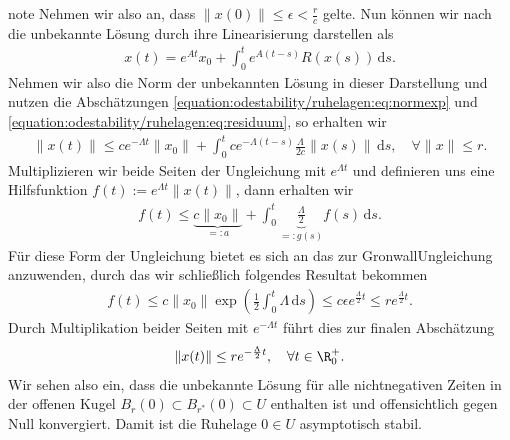 \documentclass[letterpaper,10pt,english]{jupyterBook}
\begin{document}
\begin{sphinxadmonition}{note}
\sphinxAtStartPar
Nehmen wir also an, dass \(\|x(0)\| \leq \epsilon <\frac{r}{c}\) gelte.
Nun können wir nach {\hyperref[\detokenize{odestability/ruhelagen:lem:intexpglgn}]{}} die unbekannte Lösung durch ihre Linearisierung darstellen als
\begin{equation*}
\begin{split}x(t) = e^{At}x_0 + \int_0^t e^{A(t-s)} R(x(s))\, \mathrm{d}s.\end{split}
\end{equation*}
\sphinxAtStartPar
Nehmen wir also die Norm der unbekannten Lösung in dieser Darstellung und nutzen die Abschätzungen \eqref{equation:odestability/ruhelagen:eq:normexp} und \eqref{equation:odestability/ruhelagen:eq:residuum}, so erhalten wir
\begin{equation*}
\begin{split}\|x(t)\|\leq ce^{-\Lambda t}\|x_0\| + \int_0^tce^{-\Lambda (t-s)}\frac{\Lambda}{2c}\|x(s)\|\, \mathrm{d}s, \quad \forall \|x\| \leq r.\end{split}
\end{equation*}
\sphinxAtStartPar
Multiplizieren wir beide Seiten der Ungleichung mit \(e^{\Lambda t}\) und definieren uns eine Hilfsfunktion \(f(t):=e^{\Lambda t}\|x(t)\|\), dann erhalten wir
\begin{equation*}
\begin{split}f(t)\leq \underbrace{c\|x_0\|}_{=:a} + \int_0^t \underbrace{\frac{\Lambda}{2}}_{=:g(s)} f(s)\, \mathrm{d}s.\end{split}
\end{equation*}
\sphinxAtStartPar
Für diese Form der Ungleichung bietet es sich an das {\hyperref[\detokenize{odestability/ruhelagen:lemma:Gronwall}]{}} zur Gronwall\sphinxhyphen{}Ungleichung anzuwenden, durch das wir schließlich folgendes Resultat bekommen
\begin{equation*}
\begin{split}f(t) \leq c \|x_0\| \exp{\left( \frac{1}{2} \int_0^t \Lambda \, \mathrm{d}s \right) }
\leq c \epsilon e^{\frac{\Lambda}{2} t} \leq r e^{\frac{\Lambda}{2} t}.\end{split}
\end{equation*}
\sphinxAtStartPar
Durch Multiplikation beider Seiten mit \(e^{-\Lambda t}\) führt dies zur finalen Abschätzung
\begin{equation*}
\begin{split} \|x(t)\|\leq re^{-\frac{\Lambda}{2}t}, \quad \forall t\in\R^+_0.\end{split}
\end{equation*}
\sphinxAtStartPar
Wir sehen also ein, dass die unbekannte Lösung für alle nicht\sphinxhyphen{}negativen Zeiten in der offenen Kugel \(B_r(0) \subset B_{{r^\ast}}(0) \subset U\) enthalten ist und offensichtlich gegen Null konvergiert.
Damit ist die Ruhelage \(0 \in U\) asymptotisch stabil.
\end{sphinxadmonition}
\end{document}
